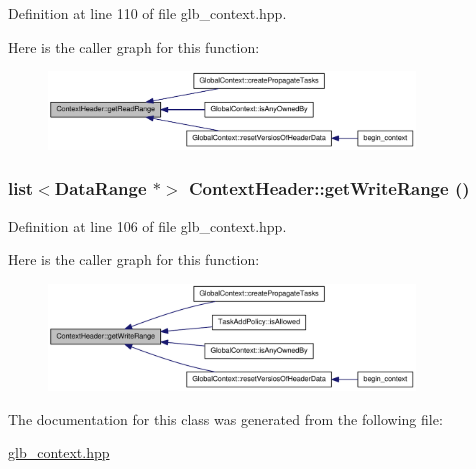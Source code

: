 Definition at line 110 of file glb\_\-context.hpp.

Here is the caller graph for this function:\nopagebreak
\begin{figure}[H]
\begin{center}
\leavevmode
\includegraphics[width=276pt]{class_context_header_aa9ee1e1368f2fb3df487d9c63f9a5103_icgraph}
\end{center}
\end{figure}
\hypertarget{class_context_header_a7fcb0018a060e3be48a54570a9ec5723}{
\subsubsection[{getWriteRange}]{\setlength{\rightskip}{0pt plus 5cm}list$<${\bf DataRange} $\ast$$>$ ContextHeader::getWriteRange ()}}
\label{class_context_header_a7fcb0018a060e3be48a54570a9ec5723}


Definition at line 106 of file glb\_\-context.hpp.

Here is the caller graph for this function:\nopagebreak
\begin{figure}[H]
\begin{center}
\leavevmode
\includegraphics[width=276pt]{class_context_header_a7fcb0018a060e3be48a54570a9ec5723_icgraph}
\end{center}
\end{figure}


The documentation for this class was generated from the following file:\begin{DoxyCompactItemize}
\item 
\hyperlink{glb__context_8hpp}{glb\_\-context.hpp}\end{DoxyCompactItemize}
